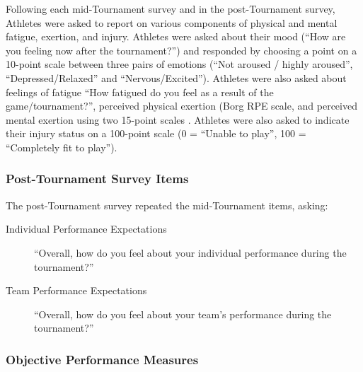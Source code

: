 Following each mid-Tournament survey and in the post-Tournament survey, Athletes were asked to report on various components of physical and mental fatigue, exertion, and injury. Athletes were asked about their mood (``How are you feeling now after the tournament?'') and responded by choosing a point on a 10-point scale between three pairs of emotions (``Not aroused / highly aroused'',  ``Depressed/Relaxed'' and  ``Nervous/Excited'').  Athletes were also asked about feelings of fatigue ``How fatigued do you feel as a result of the game/tournament?'', perceived physical exertion (Borg RPE scale, \citep{Borg1990} and perceived mental exertion using two 15-point scales \citep[see][ ]{Noakes2012a}.  Athletes were also asked to indicate their injury status on a 100-point scale (0 = ``Unable to play'', 100 = ``Completely fit to play'').




\subsubsection{\label{app5:surveyPost}Post-Tournament Survey Items}


The post-Tournament survey repeated the mid-Tournament items, asking:
\begin{description}
\item [Individual Performance Expectations] ``Overall, how do you feel about your individual performance during the tournament?''
\item [Team Performance Expectations]``Overall, how do you feel about your team's performance during the tournament?''
\end{description}












\subsubsection{\label{app5:objectivePerformance}Objective Performance Measures}

